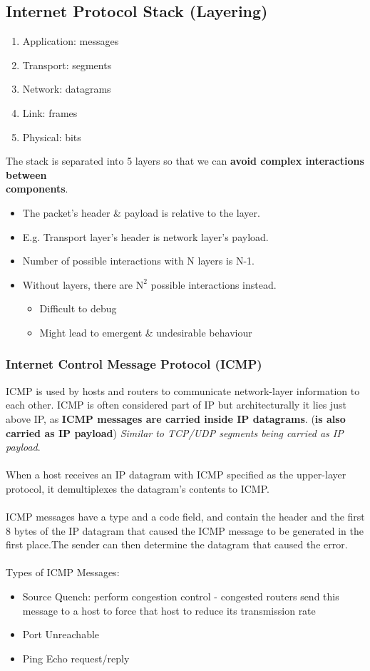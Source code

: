 \documentclass[a4paper]{article}
\begin{document}
\subsection{Internet Protocol Stack (Layering)}
\begin{enumerate}
	\item Application: messages
	\item Transport: segments
	\item Network: datagrams
	\item Link: frames
	\item Physical: bits
\end{enumerate}
The stack is separated into 5 layers so that we can \textbf{avoid complex interactions between\\ components}.
\begin{itemize}
	\item The packet's header \& payload is relative to the layer.
	\item E.g. Transport layer's header is network layer's payload.
	\item Number of possible interactions with N layers is N-1.
	\item Without layers, there are $\text{N}^2$ possible interactions instead.
	\begin{itemize}[label=$\circ$]
		\item Difficult to debug
		\item Might lead to emergent \& undesirable behaviour
	\end{itemize}
\end{itemize}
\subsubsection{Internet Control Message Protocol (ICMP)}
ICMP is used by hosts and routers to communicate network-layer information to each other. ICMP is often considered part of IP but architecturally it lies just above IP, as \textbf{ICMP messages are carried inside IP datagrams}. (\textbf{is also carried as IP payload}) \textit{Similar to TCP/UDP segments being carried as IP payload}.\\
\\ When a host receives an IP datagram with ICMP specified as the upper-layer protocol, it demultiplexes the datagram’s contents to ICMP.\\
\\ICMP messages have a type and a code field, and contain the header and the first 8 bytes of the IP datagram that caused the ICMP message to be generated in the first place.The sender can then determine the datagram that caused the error.\\
\\
Types of ICMP Messages:
\begin{itemize}
	\item Source Quench: perform congestion control - congested routers send this message to a host to force that host to reduce its transmission rate
	\item Port Unreachable
	\item Ping Echo request/reply
\end{itemize}
\newpage
\end{document}
